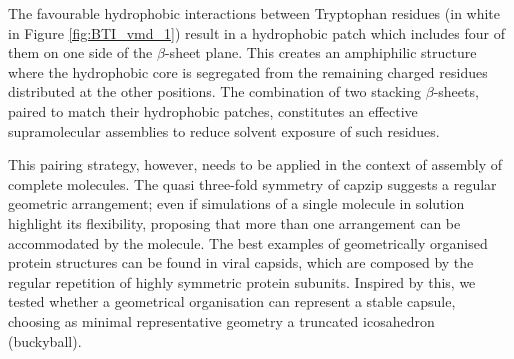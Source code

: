 
The favourable hydrophobic interactions between Tryptophan residues (in white in Figure \ref{fig:BTI_vmd_1}) result in a hydrophobic patch which includes four of them on one side of the $\beta$-sheet plane.
%
This creates an amphiphilic structure where the hydrophobic core is segregated from the remaining charged residues distributed at the other positions.
%
The combination of two stacking $\beta$-sheets, paired to match their hydrophobic patches, constitutes an effective supramolecular assemblies to reduce solvent exposure of such residues.

This pairing strategy, however, needs to be applied in the context of assembly of complete molecules.
%
The quasi three-fold symmetry of capzip suggests a regular geometric arrangement; even if simulations of a single molecule in solution highlight its flexibility, proposing that more than one arrangement can be accommodated by the molecule.
%
The best examples of geometrically organised protein structures can be found in viral capsids, which are composed by the regular repetition of highly symmetric protein subunits.
%
Inspired by this, we tested whether a geometrical organisation can represent a stable capsule, choosing as minimal representative geometry a truncated icosahedron (buckyball).

